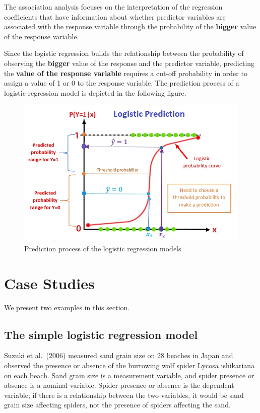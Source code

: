 \documentclass[
]{book}
\begin{document}
The association analysis focuses on the interpretation of the regression coefficients that have information about whether predictor variables are associated with the response variable through the probability of the \textbf{bigger} value of the response variable.

Since the logistic regression builds the relationship between the probability of observing the \textbf{bigger} value of the response and the predictor variable, predicting the \textbf{value of the response variable} requires a cut-off probability in order to assign a value of 1 or 0 to the response variable. The prediction process of a logistic regression model is depicted in the following figure.

\begin{figure}

{\centering \includegraphics[width=0.8\linewidth]{img04/w04-LogisticPrediction} 

}

\caption{Prediction process of the logistic regression models}\label{fig:unnamed-chunk-94}
\end{figure}

\hypertarget{case-studies}{%
\section{Case Studies}\label{case-studies}}

We present two examples in this section.

\hypertarget{the-simple-logistic-regression-model}{%
\subsection{The simple logistic regression model}\label{the-simple-logistic-regression-model}}

Suzuki et al.~(2006) measured sand grain size on 28 beaches in Japan and observed the presence or absence of the burrowing wolf spider Lycosa ishikariana on each beach. Sand grain size is a measurement variable, and spider presence or absence is a nominal variable. Spider presence or absence is the dependent variable; if there is a relationship between the two variables, it would be sand grain size affecting spiders, not the presence of spiders affecting the sand.
\end{document}
